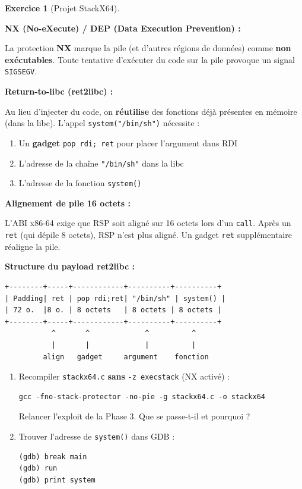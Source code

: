 \documentclass[a4paper,11pt]{article}
\theoremstyle{plain}
\theoremstyle{definition}
\newtheorem{exercice}{Exercice}
\begin{document}
\begin{exercice}[Projet StackX64]
\begin{rappel}
\textbf{NX (No-eXecute) / DEP (Data Execution Prevention) :}

La protection \textbf{NX} marque la pile (et d'autres régions de données) comme \textbf{non exécutables}. Toute tentative d'exécuter du code sur la pile provoque un signal \texttt{SIGSEGV}.

\medskip
\textbf{Return-to-libc (ret2libc) :}

Au lieu d'injecter du code, on \textbf{réutilise} des fonctions déjà présentes en mémoire (dans la libc). L'appel \texttt{system("/bin/sh")} nécessite :
\begin{enumerate}
    \item Un \textbf{gadget} \texttt{pop rdi; ret} pour placer l'argument dans RDI
    \item L'adresse de la chaîne \texttt{"/bin/sh"} dans la libc
    \item L'adresse de la fonction \texttt{system()}
\end{enumerate}

\medskip
\textbf{Alignement de pile 16 octets :}

L'ABI x86-64 exige que RSP soit aligné sur 16 octets lors d'un \texttt{call}. Après un \texttt{ret} (qui dépile 8 octets), RSP n'est plus aligné. Un gadget \texttt{ret} supplémentaire réaligne la pile.

\medskip
\textbf{Structure du payload ret2libc :}
\begin{lstlisting}[style=GDBStyle]
+--------+-----+------------+----------+----------+
| Padding| ret | pop rdi;ret| "/bin/sh" | system() |
| 72 o.  |8 o. | 8 octets   | 8 octets | 8 octets |
+--------+-----+------------+----------+----------+
           ^       ^             ^          ^
           |       |             |          |
         align   gadget     argument    fonction
\end{lstlisting}
\end{rappel}

\begin{enumerate}
\item[\textbf{4a)}] Recompiler \texttt{stackx64.c} \textbf{sans} \texttt{-z execstack} (NX activé) :
\begin{lstlisting}[style=GDBStyle]
gcc -fno-stack-protector -no-pie -g stackx64.c -o stackx64
\end{lstlisting}
Relancer l'exploit de la Phase 3. Que se passe-t-il et pourquoi ?

\item[\textbf{4b)}] Trouver l'adresse de \texttt{system()} dans GDB :
\begin{lstlisting}[style=GDBStyle]
(gdb) break main
(gdb) run
(gdb) print system
\end{lstlisting}


\end{enumerate}
\end{exercice}
\end{document}
